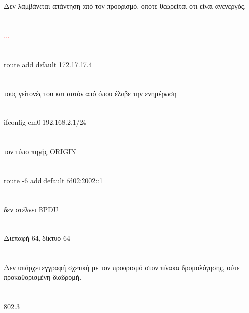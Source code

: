 \documentclass[a4paper, 12pt]{article}
\begin{document}
\section{}
	Δεν λαμβάνεται απάντηση από τον προορισμό, οπότε θεωρείται ότι είναι ανενεργός.

\section{}
	\textcolor{red}{...}

\section{}
	route add default 172.17.17.4

\section{}
	τους γείτονές του και αυτόν από όπου έλαβε την ενημέρωση

\section{}
	ifconfig em0 192.168.2.1/24

\section{}
	τον τύπο πηγής ORIGIN

\section{}
	route -6 add default fd02:2002::1

\section{}
	δεν στέλνει BPDU

\section{}
	Διεπαφή 64, δίκτυο 64

\section{}
	Δεν υπάρχει εγγραφή σχετική με τον προορισμό στον πίνακα δρομολόγησης, ούτε προκαθορισμένη διαδρομή.

\section{}
	802.3
\end{document}
